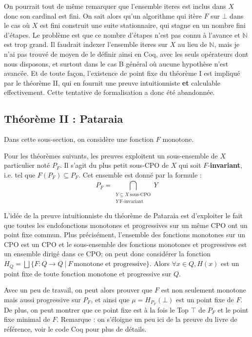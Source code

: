 \documentclass{article}
\newcommand\code[1]{{\fontfamily{lmtt}\selectfont #1}}
\theoremstyle{definition}
\begin{document}
On pourrait tout de même remarquer que l'ensemble \code{iteres} est inclus dans $X$ donc son cardinal est fini. On sait alors qu'un algorithme qui itère $F$ sur $\bot$ dans le cas où $X$ est fini construit une suite stationnaire, qui stagne en un nombre fini d'étapes. Le problème est que ce nombre d'étapes n'est pas connu à l'avance et $\mathbb{N}$ est trop grand. Il faudrait indexer l'ensemble \code{iteres} sur $X$ au lieu de $\mathbb{N}$, mais je n'ai pas trouvé de moyen de le définir ainsi en Coq, avec les seuls opérateurs dont nous disposons, et surtout dans le cas \code{B} général où aucune hypothèse n'est avancée. Et de toute façon, l'existence de point fixe du théorème I est impliqué par le théorème II, qui en fournit une preuve intuitionniste \textbf{et} calculable effectivement. Cette tentative de formalisation a donc été abandonnée.

\subsection{Théorème II : Pataraia}

Dans cette sous-section, on considère une fonction $F$ monotone.

Pour les théorèmes suivants, les preuves exploitent un sous-ensemble de $X$ particulier noté $P_F$. Il s'agit du plus petit sous-CPO de $X$ qui soit $F$-\textbf{invariant}, i.e. tel que $F (P_F) \subseteq P_F$. Cet ensemble est donné par la formule : ~
$$P_F = \bigcap\limits_{\substack{Y \subseteq X ~ \text{sous-CPO}\\ Y ~ \text{F-invariant}}}^{}Y$$

L'idée de la preuve intuitionniste du théorème de Pataraia est d'exploiter le fait que toutes les endofonctions monotones et progressives sur un même CPO ont un point fixe commun. Plus précisément, l'ensemble des fonctions monotones sur un CPO est un CPO et le sous-ensemble des fonctions monotones et progressives est un ensemble dirigé dans ce CPO; on peut donc considérer la fonction $H_Q = \bigsqcup \{F : Q \rightarrow Q ~ | ~ F ~ \text{monotone et progressive} \}$. Alors $\forall x \in Q, H(x)$ est un point fixe de toute fonction monotone et progressive sur $Q$.

Avec un peu de travail, on peut alors prouver que $F$ est non seulement monotone mais aussi progressive sur $P_F$, et ainsi que $\mu = H_{P_F}(\bot)$ est un point fixe de $F$. De plus, on peut montrer que ce point fixe est à la fois le Top $\top$ de $P_F$ et le point fixe minimal de $F$. Remarque : on s'éloigne un peu ici de la preuve du livre de référence, voir le code Coq pour plus de détails.
\end{document}
